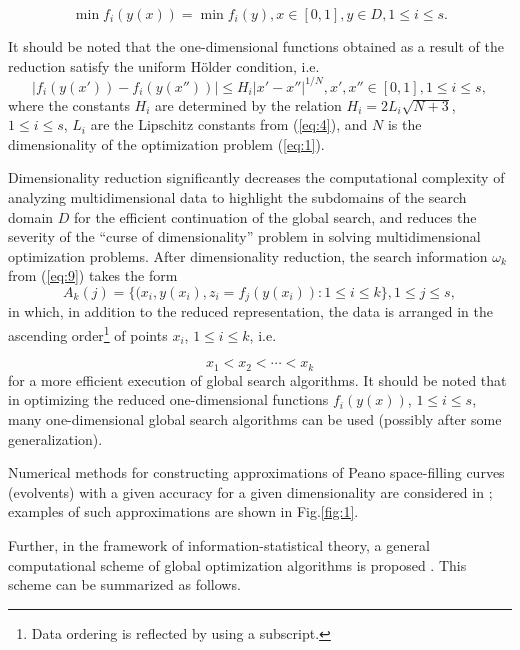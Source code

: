 \documentclass[review]{elsarticle}
\begin{document}
\begin{equation}\label{eq:11}
\min {f_i (y(x))} = \min{f_i (y)}, x \in [0,1], y \in D, 1 \leq i \leq s.
\end{equation}

It should be noted that the one-dimensional functions obtained as a result of the reduction satisfy the uniform H\"older condition, i.e.
\begin{equation}\label{eq:12}
|f_i (y(x'))-f_i (y(x''))| \leq H_i |x'-x''|^{1/N}, x',x''\in [0,1], 1 \leq i \leq s,
\end{equation}
where the constants $H_i$ are determined by the relation $H_i = 2L_i \sqrt{N+3}$, ${1 \leq i \leq s}$, $L_i$ are the Lipschitz constants from (\ref{eq:4}), and $N$ is the dimensionality of the optimization problem (\ref{eq:1}).

Dimensionality reduction significantly decreases the computational complexity of analyzing multidimensional data to highlight the subdomains of the search domain $D$ for the efficient continuation of the global search, and reduces the severity of the ``curse of dimensionality'' problem in solving multidimensional optimization problems. After dimensionality reduction, the search information $\omega_k$ from (\ref{eq:9}) takes the form
\begin{equation}\label{eq:13}
A_k (j)=\{ (x_i, y(x_i), z_i=f_j (y(x_i) ): 1 \leq i \leq k \}, 1 \leq j \leq s,
\end{equation}
in which, in addition to the reduced representation, the data is arranged in the ascending order\footnote{Data ordering is reflected by using a subscript.} of points $x_i$,  $1 \leq i \leq k$, i.e.

\begin{equation}\label{eq:14}
x_1< x_2< \cdots < x_k
\end{equation}
for a more efficient execution of global search algorithms. It should be noted that in optimizing the reduced one-dimensional functions $f_i (y(x))$, $1 \leq i \leq s$, many one-dimensional global search algorithms can be used (possibly after some generalization).

Numerical methods for constructing approximations of Peano space-filling curves (evolvents) with a given accuracy for a given dimensionality are considered in \cite{c6}; examples of such approximations are shown in Fig.\ref{fig:1}.

Further, in the framework of information-statistical theory, a general computational scheme of global optimization algorithms is proposed \cite{c6}. This scheme can be summarized as follows.
\end{document}
